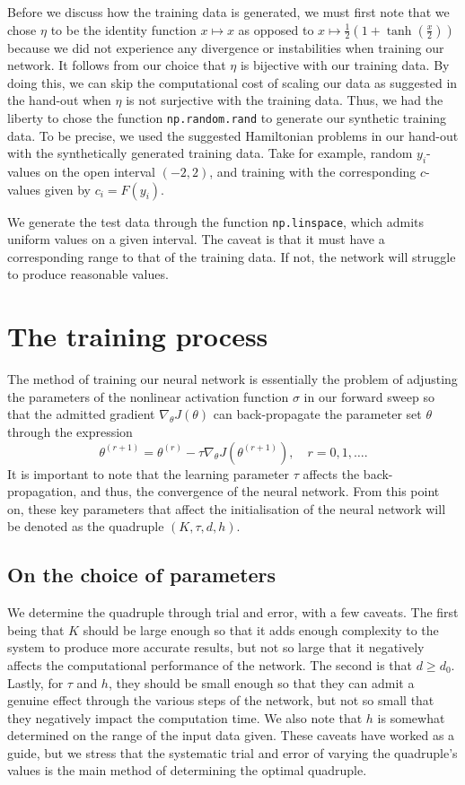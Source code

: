 \documentclass{article}
\begin{document}
Before we discuss how the training data is generated, we must first note that we chose $\eta$ to be the identity function $x \mapsto x$ as opposed to $x \mapsto \frac{1}{2}(1 + \tanh(\frac{x}{2}))$ because we did not experience any divergence or instabilities when training our network. It follows from our choice that $\eta$ is bijective with our training data. By doing this, we can skip the computational cost of scaling our data as suggested in the hand-out when $\eta$ is not surjective with the training data. Thus, we had the liberty to chose the function \verb|np.random.rand| to generate our synthetic training data. To be precise, we used the suggested Hamiltonian problems in our hand-out with the synthetically generated training data. Take for example, random $y_i$-values on the open interval $(-2,2)$, and training with the corresponding $c$-values given by $c_i=F(y_i)$.

We generate the test data through the function \verb|np.linspace|, which admits uniform values on a given interval. The caveat is that it must have a corresponding range to that of the training data. If not, the network will struggle to produce reasonable values.

\section{The training process}
The method of training our neural network is essentially the problem of adjusting the parameters of the nonlinear activation function $\sigma$ in our forward sweep so that the admitted gradient $\nabla_\theta J(\theta)$ can back-propagate the parameter set $\theta$ through the expression
\begin{equation}
    \theta^{(r+1)} = \theta^{(r)} - \tau \nabla_\theta J(\theta^{(r+1)}), \quad r=0,1,\ldots.
\end{equation}
It is important to note that the learning parameter $\tau$ affects the back-propagation, and thus, the convergence of the neural network. From this point on, these key parameters that affect the initialisation of the neural network will be denoted as the quadruple $(K, \tau, d, h)$. 

\subsection{On the choice of parameters}
We determine the quadruple through trial and error, with a few caveats. The first being that $K$ should be large enough so that it adds enough complexity to the system to produce more accurate results, but not so large that it negatively affects the computational performance of the network. The second is that $d \geq d_0$. Lastly, for $\tau$ and $h$, they should be small enough so that they can admit a genuine effect through the various steps of the network, but not so small that they negatively impact the computation time. We also note that $h$ is somewhat determined on the range of the input data given. These caveats have worked as a guide, but we stress that the systematic trial and error of varying the quadruple's values is the main method of determining the optimal quadruple.
\end{document}
